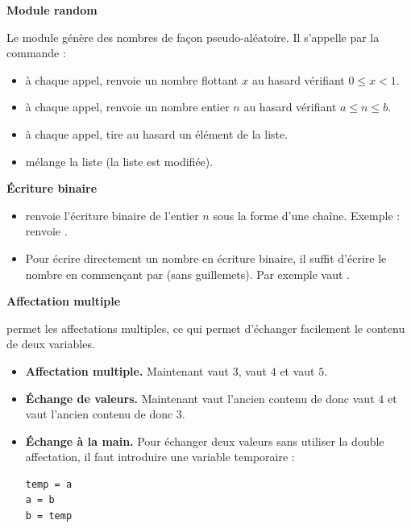 \documentclass[11pt,class=report,crop=false]{standalone}
\begin{document}
 \bigskip

\textbf{Module \og{}random\fg{}}

Le module  génère des nombres de façon pseudo-aléatoire. Il s'appelle par la commande :

\begin{itemize}
  \item {}\quad à chaque appel, renvoie un nombre flottant $x$ au hasard vérifiant  $0 \le x < 1$.
  \item {} \quad à chaque appel, renvoie un nombre entier $n$ au hasard vérifiant $a \le n \le b$.
  \item  {} \quad à chaque appel, tire au hasard un élément de la liste.
  \item {} \quad mélange la liste (la liste est modifiée).
 \end{itemize}

\bigskip

\textbf{\'Ecriture binaire}

\begin{itemize}
  \item {}\quad renvoie l'écriture binaire de l'entier $n$ sous la forme d'une chaîne. 
  Exemple :  renvoie .
  
  \item Pour écrire directement un nombre en écriture binaire, il suffit d'écrire le nombre en commençant par  (sans guillemets). Par exemple  vaut .
 \end{itemize}


\bigskip

\textbf{Affectation multiple}

\Python{} permet les affectations multiples, ce qui permet d'échanger facilement le contenu de deux variables.

\begin{itemize}
	\item \textbf{Affectation multiple.} 
	Maintenant  vaut $3$,  vaut $4$ et  vaut $5$.
	
	\item \textbf{\'Echange de valeurs.}	
	Maintenant  vaut l'ancien contenu de  donc vaut $4$ et  vaut l'ancien contenu de  donc $3$.
	
	\item \textbf{\'Echange à la main.} Pour échanger deux valeurs sans utiliser la double affectation, il faut introduire une variable temporaire :
\begin{lstlisting}		
temp = a
a = b
b = temp			
\end{lstlisting}
\end{itemize}
\end{document}
